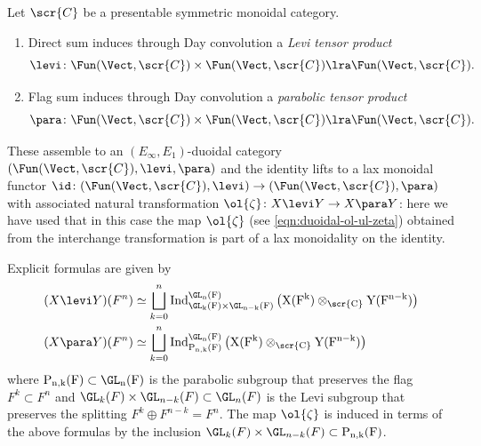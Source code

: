\documentclass[a4paper]{amsart}
\begin{document}
\begin{definition}Let $\scr{C}$ be a presentable symmetric monoidal category.
\begin{enumerate}
    \item Direct sum induces through Day convolution a \emph{Levi tensor product}
    \[\levi \colon \Fun(\Vect,\scr{C}) \times \Fun(\Vect,\scr{C}) \lra \Fun(\Vect,\scr{C}).\]
    \item Flag sum induces through Day convolution a \emph{parabolic tensor product}
    \[\para \colon \Fun(\Vect,\scr{C}) \times \Fun(\Vect,\scr{C}) \lra \Fun(\Vect,\scr{C}).\]
\end{enumerate}
\end{definition}

These assemble to an $(E_\infty,E_1)$-duoidal category $(\Fun(\Vect,\scr{C}),\levi,\para)$ and the identity lifts to a lax monoidal functor $\id \colon (\Fun(\Vect,\scr{C}),\levi) \to (\Fun(\Vect,\scr{C}),\para)$ with associated natural transformation $\ol{\zeta} \colon X \levi Y \to X \para Y$: here we have used that in this case the map $\ol{\zeta}$ (see \eqref{eqn:duoidal-ol-ul-zeta}) obtained from the interchange transformation is part of a lax monoidality on the identity.

\begin{example}\label{exam:levi-para-explicit-formulas} Explicit formulas are given by
\begin{align*}(X \levi Y)(F^n) &\simeq \bigsqcup_{k=0}^n \rm{Ind}^{\GL_n(F)}_{\GL_k(F) \times \GL_{n-k}(F)} \left(X(F^k) \otimes_\scr{C} Y(F^{n-k})\right) \\
(X \para Y)(F^n) &\simeq \bigsqcup_{k=0}^n \rm{Ind}^{\GL_n(F)}_{\rm{P}_{n,k}(F)} \left(X(F^k) \otimes_\scr{C} Y(F^{n-k})\right)\end{align*}
where $\rm{P}_{n,k}(F) \subset \GL_n(F)$ is the parabolic subgroup 
that preserves the flag $F^k \subset F^n$ and $\GL_k(F) \times \GL_{n-k}(F) \subset \GL_n(F)$ is the Levi subgroup that preserves the splitting $F^k \oplus F^{n-k} = F^n$. The map $\ol{\zeta}$ is induced in terms of the above formulas by the inclusion $\GL_k(F) \times \GL_{n-k}(F) \subset \rm{P}_{n,k}(F)$.\end{example}
\end{document}
